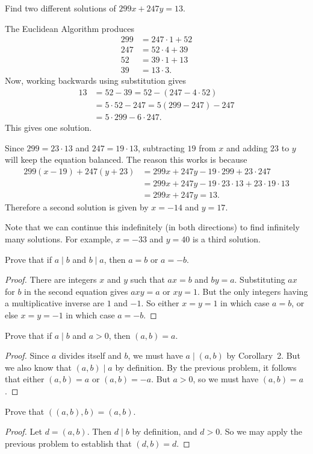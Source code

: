  Find two different solutions of $299x + 247y = 13$.
\begin{solution}
  The Euclidean Algorithm produces
  \begin{align*}
    299 &= 247\cdot1 + 52 \\
    247 &= 52\cdot4 + 39 \\
    52 &= 39\cdot1 + 13 \\
    39 &= 13\cdot3.
  \end{align*}
  Now, working backwards using substitution gives
  \begin{align*}
    13 &= 52 - 39 = 52 - (247 - 4\cdot52) \\
       &= 5\cdot52 - 247 = 5(299 - 247) - 247 \\
       &= 5\cdot299 - 6\cdot247.
  \end{align*}
  This gives one solution.

  Since $299 = 23\cdot13$ and $247 = 19\cdot13$, subtracting $19$ from
  $x$ and adding $23$ to $y$ will keep the equation
  balanced. The reason this works is because
  \begin{align*}
    299(x - 19) + 247(y + 23)
    &= 299x + 247y - 19\cdot299 + 23\cdot247 \\
    &= 299x + 247y - 19\cdot23\cdot13 + 23\cdot19\cdot13 \\
    &= 299x + 247y = 13.
  \end{align*}
  Therefore a second solution is given by $x = -14$ and $y = 17$.

  Note that we can continue this indefinitely (in both directions) to
  find infinitely many solutions. For example, $x = -33$ and $y = 40$
  is a third solution.
\end{solution}

 Prove that if $a\mid b$ and $b\mid a$, then $a = b$ or
$a = -b$.
\begin{proof}
  There are integers $x$ and $y$ such that $ax = b$ and $by =
  a$. Substituting $ax$ for $b$ in the second equation gives $axy = a$
  or $xy = 1$. But the only integers having a multiplicative inverse
  are $1$ and $-1$. So either $x = y = 1$ in which case $a = b$, or
  else $x = y = -1$ in which case $a = -b$.
\end{proof}

 Prove that if $a\mid b$ and $a > 0$, then $(a,b) = a$.
\begin{proof}
  Since $a$ divides itself and $b$, we must have $a \mid (a,b)$ by
  Corollary~2. But we also know that $(a,b)\mid a$ by definition. By
  the previous problem, it follows that either $(a,b) = a$ or
  $(a,b) = -a$. But $a > 0$, so we must have $(a,b) = a$.
\end{proof}

 Prove that $((a,b), b) = (a,b)$.
\begin{proof}
  Let $d = (a,b)$. Then $d\mid b$ by definition, and $d > 0$. So we
  may apply the previous problem to establish that $(d,b) = d$.
\end{proof}
